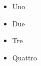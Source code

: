 \documentclass{beamer}
\begin{document}
 \begin{frame}
  \begin{itemize}
   \item<1-> Uno
   \item<2-> Due
   \item<3-> Tre
   \item<4-> Quattro
  \end{itemize}

 \end{frame}
\end{document}
